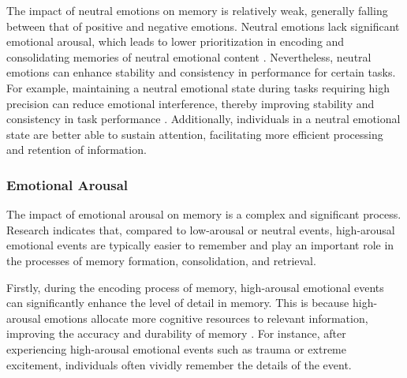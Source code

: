 The impact of neutral emotions on memory is relatively weak, generally falling between that of positive and negative emotions. Neutral emotions lack significant emotional arousal, which leads to lower prioritization in encoding and consolidating memories of neutral emotional content \cite{earles2016memory, kensinger2020retrieval, megalakaki2019effects, lindstrom2011emotion}. Nevertheless, neutral emotions can enhance stability and consistency in performance for certain tasks. For example, maintaining a neutral emotional state during tasks requiring high precision can reduce emotional interference, thereby improving stability and consistency in task performance \cite{kensinger2006processing, storbeck2005sadness}. Additionally, individuals in a neutral emotional state are better able to sustain attention, facilitating more efficient processing and retention of information.

\subsubsection{Emotional Arousal}
The impact of emotional arousal on memory is a complex and significant process. Research indicates that, compared to low-arousal or neutral events, high-arousal emotional events are typically easier to remember and play an important role in the processes of memory formation, consolidation, and retrieval. 

Firstly, during the encoding process of memory, high-arousal emotional events can significantly enhance the level of detail in memory. This is because high-arousal emotions allocate more cognitive resources to relevant information, improving the accuracy and durability of memory \cite{mather2011arousal}. For instance, after experiencing high-arousal emotional events such as trauma or extreme excitement, individuals often vividly remember the details of the event. 

